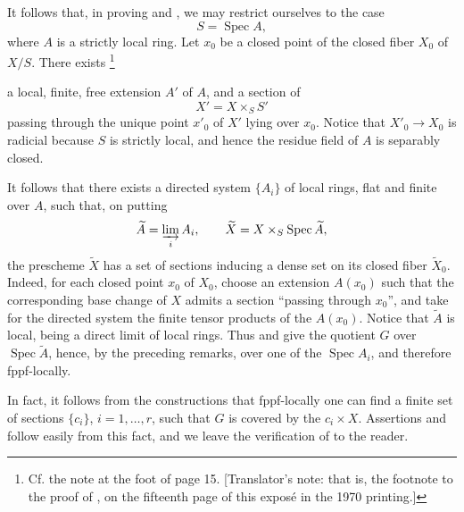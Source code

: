 It follows that, in proving  and , we may
restrict ourselves to the case
\[
  S=\operatorname{Spec}A,
\]
where \(A\) is a strictly local ring. Let \(x_0\) be a closed
point of the closed fiber \(X_0\) of \(X/S\). There
exists\begingroup
\renewcommand{\thefootnote}{\ensuremath{\ast}}\footnote{Cf. the
note at the foot of page 15. [Translator's note: that is, the footnote to the proof of
, on the fifteenth page of this exposé in the 1970
printing.]}
\addtocounter{footnote}{-1}
\endgroup{} a local, finite, free extension \(A'\) of \(A\), and
a section of
\[
  X'=X\times_S S'
\]
passing through the unique point \(x'_0\) of \(X'\) lying over
\(x_0\). Notice that \(X'_0\to X_0\) is radicial because \(S\)
is strictly local, and hence the residue field of \(A\) is
separably closed.

It follows that there exists a directed system \(\{A_i\}\) of
local rings, flat and finite over \(A\), such that, on putting
\[
  \widetilde A=\varinjlim_i A_i,\qquad
  \widetilde X=X\times_S\operatorname{Spec}\widetilde A,
\]
the prescheme \(\widetilde X\) has a set of sections inducing a
dense set on its closed fiber \(\widetilde X_0\). Indeed, for
each closed point \(x_0\) of \(X_0\), choose an extension
\(A(x_0)\) such that the corresponding base change of \(X\)
admits a section ``passing through \(x_0\)'', and take for the
directed system the finite tensor products of the \(A(x_0)\).
Notice that \(\widetilde A\) is local, being a direct limit of
local rings. Thus  and  give the quotient \(G\)
over \(\operatorname{Spec}\widetilde A\), hence, by the preceding
remarks, over one of the \(\operatorname{Spec}A_i\), and therefore
fppf-locally.

In fact, it follows from the constructions that fppf-locally one
can find a finite set of sections
\(\{c_i\}\), \(i=1,\ldots,r\), such that \(G\) is covered by the
\(c_i\times X\). Assertions  and  follow easily from this
fact, and we leave the verification of  to the reader.

